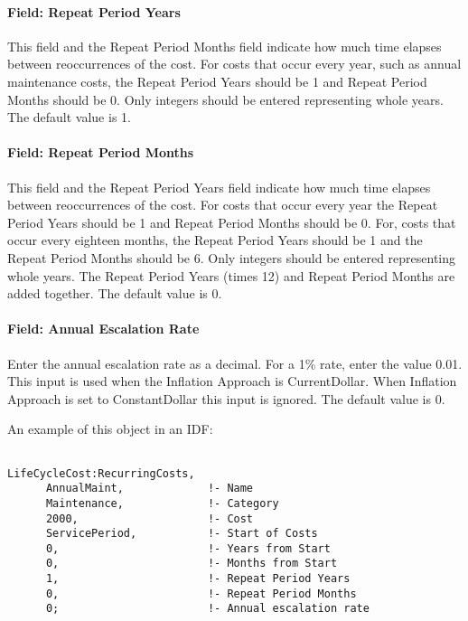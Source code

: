 \paragraph{Field: Repeat Period Years}\label{field-repeat-period-years}

This field and the Repeat Period Months field indicate how much time elapses between reoccurrences of the cost. For costs that occur every year, such as annual maintenance costs, the Repeat Period Years should be 1 and Repeat Period Months should be 0. Only integers should be entered representing whole years. The default value is 1.

\paragraph{Field: Repeat Period Months}\label{field-repeat-period-months}

This field and the Repeat Period Years field indicate how much time elapses between reoccurrences of the cost. For costs that occur every year the Repeat Period Years should be 1 and Repeat Period Months should be 0. For, costs that occur every eighteen months, the Repeat Period Years should be 1 and the Repeat Period Months should be 6. Only integers should be entered representing whole years. The Repeat Period Years (times 12) and Repeat Period Months are added together. The default value is 0.

\paragraph{Field: Annual Escalation Rate}\label{field-annual-escalation-rate}

Enter the annual escalation rate as a decimal. For a 1\% rate, enter the value 0.01. This input is used when the Inflation Approach is CurrentDollar. When Inflation Approach is set to ConstantDollar this input is ignored. The default value is 0.

An example of this object in an IDF:

\begin{lstlisting}

LifeCycleCost:RecurringCosts,
      AnnualMaint,             !- Name
      Maintenance,             !- Category
      2000,                    !- Cost
      ServicePeriod,           !- Start of Costs
      0,                       !- Years from Start
      0,                       !- Months from Start
      1,                       !- Repeat Period Years
      0,                       !- Repeat Period Months
      0;                       !- Annual escalation rate
\end{lstlisting}
